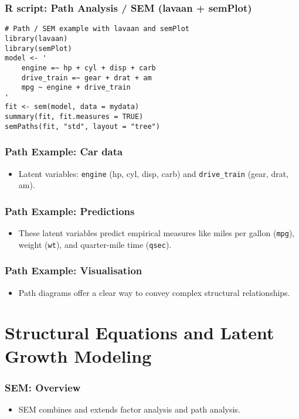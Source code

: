 \documentclass{beamer}
\begin{document}
\begin{frame}[fragile]
        \frametitle{R script: Path Analysis / SEM (lavaan + semPlot)}
        \begin{verbatim}
# Path / SEM example with lavaan and semPlot
library(lavaan)
library(semPlot)
model <- '
    engine =~ hp + cyl + disp + carb
    drive_train =~ gear + drat + am
    mpg ~ engine + drive_train
'
fit <- sem(model, data = mydata)
summary(fit, fit.measures = TRUE)
semPaths(fit, "std", layout = "tree")
        \end{verbatim}
\end{frame}

\begin{frame}
    \frametitle{Path Example: Car data}
    \begin{itemize}
        \item Latent variables: \texttt{engine} (hp, cyl, disp, carb) and \texttt{drive\_train} (gear, drat, am).
    \end{itemize}
\end{frame}

\begin{frame}
    \frametitle{Path Example: Predictions}
    \begin{itemize}
        \item These latent variables predict empirical measures like miles per gallon (\texttt{mpg}), weight (\texttt{wt}), and quarter-mile time (\texttt{qsec}).
    \end{itemize}
\end{frame}

\begin{frame}
    \frametitle{Path Example: Visualisation}
    \begin{itemize}
        \item Path diagrams offer a clear way to convey complex structural relationships.
    \end{itemize}
\end{frame}

\section{Structural Equations and Latent Growth Modeling}
\begin{frame}
    \frametitle{SEM: Overview}
    \begin{itemize}
        \item SEM combines and extends factor analysis and path analysis.
    \end{itemize}
\end{frame}
\end{document}
